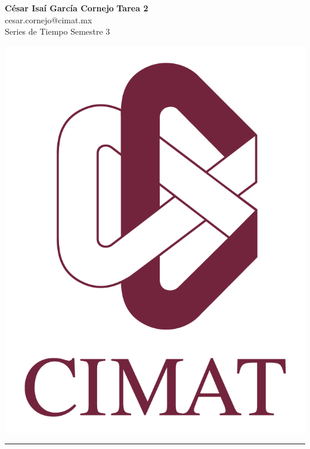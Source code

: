 \documentclass[a4paper, 11pt]{article}
\begin{document}
	\noindent
	
	\begin{minipage}[b][1.2cm][t]{0.8\textwidth}
		\large\textbf{César Isaí García Cornejo} \hfill \textbf{Tarea 2}  \\
		cesar.cornejo@cimat.mx \hfill \\
		\normalsize Series de Tiempo \hfill Semestre 3\\
	\end{minipage}
	
	\hspace{14.4cm}
	\begin{minipage}[b][0.03cm][t]{0.12\linewidth}
		
		\vspace{-2.2cm}
		\includegraphics[scale=0.3]{Figures/EscudoCimat.png}
	\end{minipage}
	
	\noindent\rule{7in}{2.8pt}
	
\end{document}

